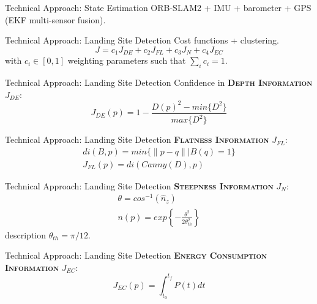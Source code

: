 \documentclass{beamer}
\begin{document}
    \begin{frame}{Technical Approach: State Estimation}
        ORB-SLAM2 + IMU + barometer + GPS (EKF multi-sensor fusion).
    \end{frame}

    \begin{frame}{Technical Approach: Landing Site Detection}
        Cost functions + clustering.
        \begin{equation*}
            J = c_1 J_{DE} + c_2 J_{FL} + c_3 J_{N} + c_4 J_{EC}
        \end{equation*}
        with $c_i \in [0, 1]$ weighting parameters such that
        $\sum_i c_i = 1$.
    \end{frame}

    \begin{frame}{Technical Approach: Landing Site Detection}
        Confidence in \textbf{\textsc{Depth Information}} $J_{DE}$:
        \begin{equation*}
            J_{DE}(p) = 1 - \frac{D(p)^2 - min\{D^2\}}{max\{D^2\}}
        \end{equation*}
    \end{frame}

    \begin{frame}{Technical Approach: Landing Site Detection}
        \textbf{\textsc{Flatness Information}} $J_{FL}$:
        \begin{gather*}
            di(B, p) = min\Big\{\|p-q\| \Big| B(q)=1\Big\} \\
            J_{FL}(p) = di(Canny(D), p)
        \end{gather*}
    \end{frame}

    \begin{frame}{Technical Approach: Landing Site Detection}
        \textbf{\textsc{Steepness Information}} $J_{N}$:
        \begin{gather*}
            \theta = cos^{-1}(\hat{n}_z) \\
            n(p) = exp\left\{ -\frac{\theta^2}{2\theta^2_{th}} \right\}
        \end{gather*}
        description $\theta_{th}=\pi/12$.
    \end{frame}

    \begin{frame}{Technical Approach: Landing Site Detection}
        \textbf{\textsc{Energy Consumption Information}} $J_{EC}$:
        \begin{equation*}
            J_{EC}(p) = \int_{t_0}^{t_f} P(t)dt
        \end{equation*}
    \end{frame}
\end{document}

